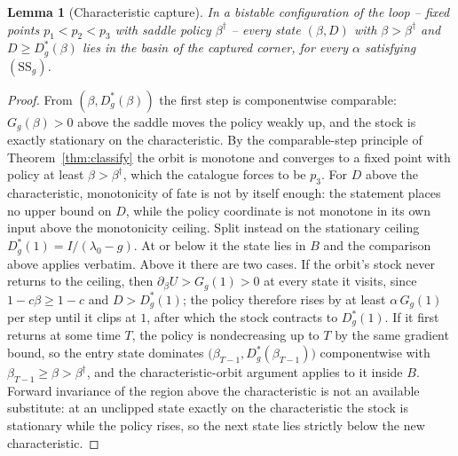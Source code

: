 \documentclass[11pt]{article}
\newtheorem{lemma}[theorem]{Lemma}
\theoremstyle{definition}
\theoremstyle{remark}
\numberwithin{equation}{section}
\begin{document}
\begin{lemma}[Characteristic capture]\label{lem:charcap}
In a bistable configuration of the loop -- fixed points $p_1 < p_2 < p_3$ with saddle policy $\beta^\dagger$ -- every state $(\beta, D)$ with $\beta > \beta^\dagger$ and $D \ge D^\ast_g(\beta)$ lies in the basin of the captured corner, for every $\alpha$ satisfying $(\mathrm{SS}_g)$.
\end{lemma}
\begin{proof}
From $(\beta, D^\ast_g(\beta))$ the first step is componentwise comparable: $G_g(\beta) > 0$ above the saddle moves the policy weakly up, and the stock is exactly stationary on the characteristic. By the comparable-step principle of Theorem~\ref{thm:classify} the orbit is monotone and converges to a fixed point with policy at least $\beta > \beta^\dagger$, which the catalogue forces to be $p_3$. For $D$ above the characteristic, monotonicity of fate is not by itself enough: the statement places no upper bound on $D$, while the policy coordinate is not monotone in its own input above the monotonicity ceiling. Split instead on the stationary ceiling $D^\ast_g(1) = I/(\lambda_0-g)$. At or below it the state lies in $B$ and the comparison above applies verbatim. Above it there are two cases. If the orbit's stock never returns to the ceiling, then $\partial_\beta U > G_g(1) > 0$ at every state it visits, since $1-c\beta \ge 1-c$ and $D > D^\ast_g(1)$; the policy therefore rises by at least $\alpha\,G_g(1)$ per step until it clips at $1$, after which the stock contracts to $D^\ast_g(1)$. If it first returns at some time $T$, the policy is nondecreasing up to $T$ by the same gradient bound, so the entry state dominates $\bigl(\beta_{T-1}, D^\ast_g(\beta_{T-1})\bigr)$ componentwise with $\beta_{T-1} \ge \beta > \beta^\dagger$, and the characteristic-orbit argument applies to it inside $B$. Forward invariance of the region above the characteristic is not an available substitute: at an unclipped state exactly on the characteristic the stock is stationary while the policy rises, so the next state lies strictly below the new characteristic.
\end{proof}
\end{document}
